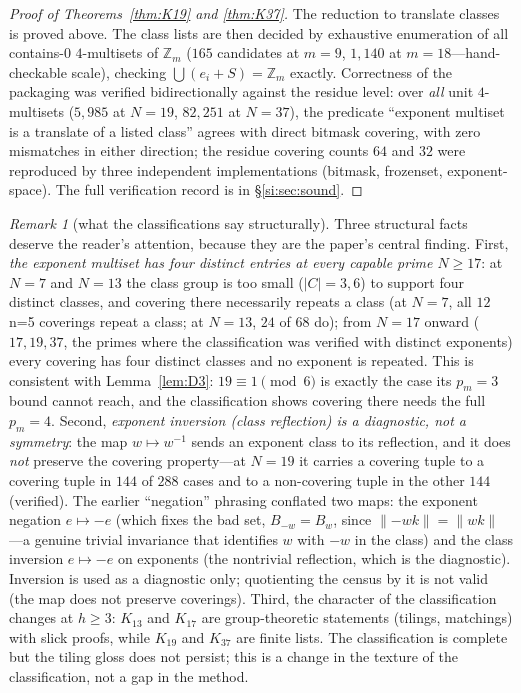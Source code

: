 \documentclass[11pt,a4paper]{article}
\numberwithin{equation}{section}
\theoremstyle{plain}
\theoremstyle{plain}
\theoremstyle{definition}
\theoremstyle{remark}
\newtheorem{remark}[theorem]{Remark}
\newcommand{\Z}{\mathbb{Z}}
\begin{document}
\begin{proof}[Proof of Theorems~\ref{thm:K19} and \ref{thm:K37}]
The reduction to translate classes is proved above. The class lists are
then decided by exhaustive enumeration of all contains-$0$ $4$-multisets
of $\Z_m$ ($165$ candidates at $m=9$, $1{,}140$ at $m=18$---hand-checkable
scale), checking $\bigcup(e_i+S)=\Z_m$ exactly. Correctness of the
packaging was verified bidirectionally against the residue level: over
\emph{all} unit $4$-multisets ($5{,}985$ at $N=19$, $82{,}251$ at
$N=37$), the predicate ``exponent multiset is a translate of a listed
class'' agrees with direct bitmask covering, with zero mismatches in
either direction; the residue covering counts $64$ and $32$ were
reproduced by three independent implementations (bitmask, frozenset,
exponent-space). The full verification record is in \S\ref{si:sec:sound}.
\end{proof}

\begin{remark}[what the classifications say structurally]\label{rem:pattern}
Three structural facts deserve the reader's attention, because they are
the paper's central finding. First, \emph{the exponent multiset has four
distinct entries at every capable prime $N\ge 17$}: at $N=7$ and $N=13$
the class group is too small ($|C|=3,6$) to support four distinct
classes, and covering there necessarily repeats a class (at $N=7$, all
$12$ n=5 coverings repeat a class; at $N=13$, $24$ of $68$ do); from
$N=17$ onward ($17,19,37$, the primes where the classification was
verified with distinct exponents) every covering has four distinct
classes and no exponent is repeated. This is consistent with
Lemma~\ref{lem:D3}: $19\equiv 1\pmod 6$ is exactly the case its $p_m=3$
bound cannot reach, and the classification shows covering there needs the
full $p_m=4$. Second, \emph{exponent inversion (class reflection) is a
diagnostic, not a symmetry}: the map $w\mapsto w^{-1}$ sends an exponent
class to its reflection, and it does \emph{not} preserve the covering
property---at $N=19$ it carries a covering tuple to a covering tuple in
$144$ of $288$ cases and to a non-covering tuple in the other $144$
(verified). The earlier ``negation'' phrasing conflated two maps: the
exponent negation $e\mapsto-e$ (which fixes the bad set, $B_{-w}=B_w$,
since $\lVert-wk\rVert=\lVert wk\rVert$---a genuine trivial invariance
that identifies $w$ with $-w$ in the class) and the class inversion
$e\mapsto-e$ on exponents (the nontrivial reflection, which is the
diagnostic). Inversion is used as a diagnostic only; quotienting the census by
it is not valid (the map does not preserve coverings). Third, the character
of the classification changes at $h\ge 3$: $K_{13}$ and $K_{17}$ are
group-theoretic statements (tilings, matchings) with slick proofs, while
$K_{19}$ and $K_{37}$ are finite lists. The classification is complete but
the tiling gloss does not persist; this is a change in the texture of
the classification, not a gap in the method.
\end{remark}
\end{document}
